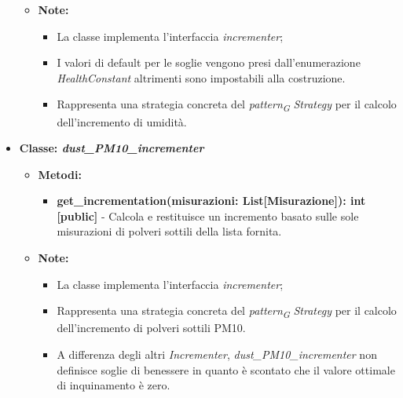 \begin{itemize}
\begin{itemize}
\begin{itemize}
    \end{itemize}
    \item\textbf{Note:}
        \begin{itemize}
            \item La classe implementa l'interfaccia \textit{incrementer};
            \item I valori di default per le soglie vengono presi dall'enumerazione \textit{HealthConstant} altrimenti sono impostabili alla costruzione.
            \item Rappresenta una strategia concreta del \textit{pattern}\textsubscript{\textit{G}} \textit{Strategy} per il calcolo dell'incremento di umidità.
        \end{itemize}
    \end{itemize}\item{\textbf{Classe: \textit{dust\_PM10\_incrementer}}}
    \begin{itemize}
    \item \textbf{Metodi: } 
    \begin{itemize}
        \item \textbf{get\_incrementation(misurazioni: List[Misurazione]): int [public]} - Calcola e restituisce un incremento basato sulle sole misurazioni di polveri sottili della lista fornita.
    \end{itemize}
    \item\textbf{Note:}
        \begin{itemize}
            \item La classe implementa l'interfaccia \textit{incrementer};
            \item Rappresenta una strategia concreta del \textit{pattern}\textsubscript{\textit{G}} \textit{Strategy} per il calcolo dell'incremento di polveri sottili PM10.
            \item A differenza degli altri \textit{Incrementer}, \textit{dust\_PM10\_incrementer} non definisce soglie di benessere in quanto è scontato che il valore ottimale di inquinamento è zero.
        \end{itemize}
    \end{itemize}

\end{itemize}

